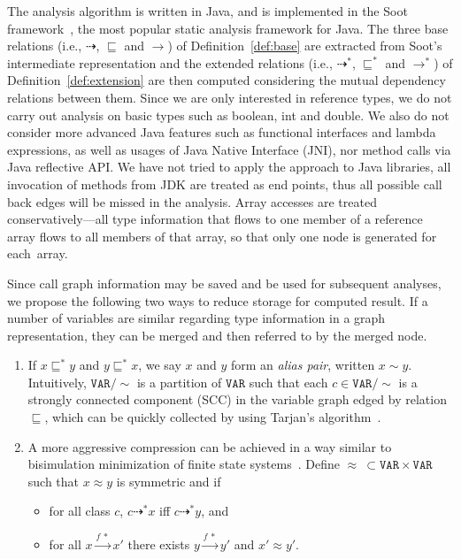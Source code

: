 \documentclass[runningheads]{llncs}
\newcommand\Var{\mathtt{VAR}}
\newcommand{\less}{\sqsubseteq}
\newcommand{\tflow}{\dashrightarrow}
\newcommand{\hflow}{\longrightarrow}
\newcommand{\lhflow}[1]{\stackrel{#1}{\hflow}}
\begin{document}
The analysis algorithm is written in Java, and is implemented in the Soot framework~\cite{soot}, the most popular static analysis framework for Java. The three base relations (i.e., $\tflow$, $\less$ and $\rightarrow$) of Definition~\ref{def:base} are extracted from Soot's intermediate representation and the extended relations (i.e., $\tflow^*$, $\less^*$ and $\rightarrow^*$) of Definition~\ref{def:extension} are then computed considering the mutual dependency relations between them. Since we are only interested in reference types, we do not carry out analysis on basic types such as \textsf{boolean}, \textsf{int} and \textsf{double}. We also do not consider more advanced Java features such as functional interfaces and lambda expressions, as well as usages of Java Native Interface (JNI), nor method calls via Java reflective API. We have not tried to apply the approach to Java libraries, all invocation of methods from JDK are treated as end points, thus all possible call back edges will be missed in the analysis.
%
Array accesses are treated conservatively---all type information that flows to one member of a reference array flows to all members of that array, so that only one node is generated for each~array.

Since call graph information may be saved and be used for subsequent analyses, we propose the following two ways to reduce storage for computed result. If a number of variables are similar regarding type information in a graph representation, they can be merged and then referred to by the merged node.

\begin{enumerate}
  \item If $x\less^*y$ and $y\less^*x$, we say $x$ and $y$ form an \emph{alias pair}, written $x\sim y$. Intuitively, $\Var/\sim$ is a partition of $\Var$ such that each $c\in\Var/\sim$ is a strongly connected component (SCC) in the variable graph edged by relation $\less$, which can be quickly collected by using Tarjan's algorithm~\cite{Tarjan72}.
  \item A more aggressive compression can be achieved in a way similar to bisimulation minimization of finite state systems~\cite{Kanellakis90,Paige87}. Define $\approx\ \subset\Var\times\Var$ such that $x\approx y$ is symmetric and if
      \begin{itemize}
      \item for all class $c$, $c\tflow^* x$ iff $c\tflow^*y$, and
      \item for all $x\lhflow{f\ *}x'$ there exists $y\lhflow{f\ *}y'$ and $x'\approx y'$.
      \end{itemize}
\end{enumerate}
\end{document}
